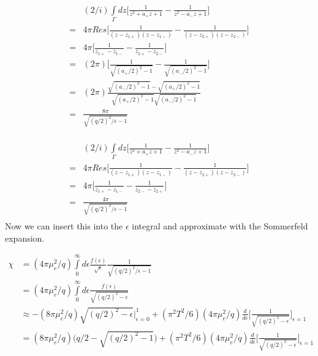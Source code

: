 \documentclass{article}
\begin{document}
   \begin{align*}
  &(2/i)\int\limits_\Gamma dz \bigg[ \frac{1}{z^2+a_+z+1} -\frac{1}{z^2-a_-z+1} \bigg] \\
    =&4\pi Res\bigg[ \frac{1}{(z-z_{1+})(z-z_{1-})} -\frac{1}{(z-z_{2+})(z-z_{2-})} \bigg]  \\
  =&4\pi\bigg[ \frac{1}{z_{1+}-z_{1-}} -\frac{1}{z_{2+}-z_{2-}} \bigg]  \\
  =&(2\pi)\bigg[ \frac{1}{\sqrt{(a_+/2)^2-1}} -\frac{1}{\sqrt{(a_-/2)^2-1}} \bigg]  \\
    =&(2\pi)\frac{\sqrt{(a_-/2)^2-1}-\sqrt{(a_+/2)^2-1}}{\sqrt{(a_+/2)^2-1}\sqrt{(a_-/2)^2-1}} \\
   =&\frac{8\pi}{\sqrt{(q/2)^2/\epsilon-1}}  \\
    \end{align*}

  \begin{align*}
  &(2/i)\int\limits_\Gamma dz \bigg[ \frac{1}{z^2+a_+z+1} -\frac{1}{z^2-a_-z+1} \bigg] \\
    =&4\pi Res\bigg[ \frac{1}{(z-z_{1+})(z-z_{1-})} -\frac{1}{(z-z_{2+})(z-z_{2-})} \bigg]  \\
  =&4\pi\bigg[ \frac{1}{z_{1+}-z_{1-}} -\frac{1}{z_{2-}-z_{2+}} \bigg]  \\
   =&\frac{4\pi}{\sqrt{(q/2)^2/\epsilon-1}}  \\
    \end{align*}
   Now we can insert this into the $\epsilon$ integral and approximate with the Sommerfeld expansion.
   
   \begin{align*}
    \chi &= (4\pi\mu_e^2/q)\int \limits_0^{\infty}d\epsilon \frac{f(\epsilon)}{\sqrt{\epsilon}}\frac{1}{\sqrt{(q/2)^2/\epsilon-1}}\\
    &= (4\pi\mu_e^2/q)\int \limits_0^{\infty}d\epsilon \frac{f(\epsilon)}{\sqrt{(q/2)^2-\epsilon}}\\
     &\approx-(8\pi\mu_e^2/q)\sqrt{(q/2)^2-\epsilon} \bigg|_{\epsilon=0}^1+ (\pi^2 T^2/6)(4\pi\mu_e^2/q)\frac{d}{d\epsilon}\bigg[\frac{1}{\sqrt{(q/2)^2-\epsilon}}\bigg]_{\epsilon=1}\\
       &=(8\pi\mu_e^2/q)\big(q/2-\sqrt{(q/2)^2-1}\big)+ (\pi^2 T^2/6)(4\pi\mu_e^2/q)\frac{d}{d\epsilon}\bigg[\frac{1}{\sqrt{(q/2)^2-\epsilon}}\bigg]_{\epsilon=1}\\
   \end{align*}
   
\end{document}
